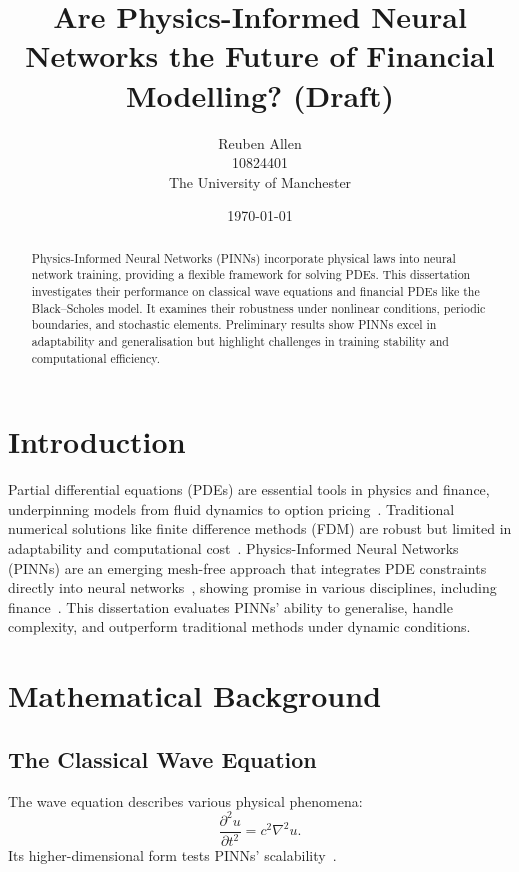 \documentclass[12pt,a4paper]{article}
\title{Are Physics-Informed Neural Networks the Future of Financial Modelling? (Draft)}
\author{Reuben Allen \\ 10824401 \\ The University of Manchester}
\date{\today}
\begin{document}
\maketitle

\begin{abstract}
Physics-Informed Neural Networks (PINNs) incorporate physical laws into neural network training, providing a flexible framework for solving PDEs. This dissertation investigates their performance on classical wave equations and financial PDEs like the Black–Scholes model. It examines their robustness under nonlinear conditions, periodic boundaries, and stochastic elements. Preliminary results show PINNs excel in adaptability and generalisation but highlight challenges in training stability and computational efficiency.
\end{abstract}

\newpage
\tableofcontents
\newpage

\section{Introduction}

Partial differential equations (PDEs) are essential tools in physics and finance, underpinning models from fluid dynamics to option pricing~\cite{black1973pricing}. Traditional numerical solutions like finite difference methods (FDM) are robust but limited in adaptability and computational cost~\cite{leveque2007finite,morton2005numerical}. Physics-Informed Neural Networks (PINNs) are an emerging mesh-free approach that integrates PDE constraints directly into neural networks~\cite{raissi2019physics,karniadakis2021physics}, showing promise in various disciplines, including finance~\cite{sirignano2018deep,cuomo2022scientific}. This dissertation evaluates PINNs' ability to generalise, handle complexity, and outperform traditional methods under dynamic conditions.

\section{Mathematical Background}

\subsection{The Classical Wave Equation}

The wave equation describes various physical phenomena:
\[
\frac{\partial^2 u}{\partial t^2}=c^2\nabla^2 u.
\]
Its higher-dimensional form tests PINNs' scalability~\cite{cuomo2022scientific,raissi2019physics}.
\end{document}
